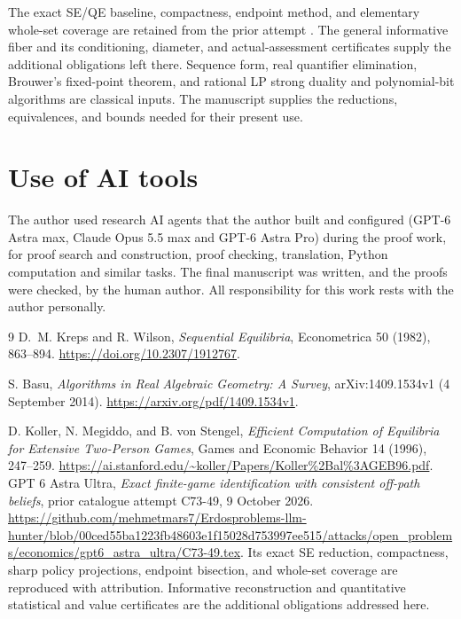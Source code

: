 \documentclass[11pt,a4paper]{article}
\numberwithin{equation}{section}
\theoremstyle{definition}
\begin{document}
The exact SE/QE baseline, compactness, endpoint method, and elementary
whole-set coverage are retained from the prior attempt \cite{Prior}.
The general informative fiber and its conditioning, diameter, and
actual-assessment certificates supply the additional obligations
left there. Sequence form, real quantifier elimination, Brouwer's
fixed-point theorem, and rational LP strong duality and polynomial-bit
algorithms are classical inputs. The manuscript supplies the
reductions, equivalences, and bounds needed for their present use.

\section*{Use of AI tools}
The author used research AI agents that the author built and configured (GPT-6 Astra max,
Claude Opus 5.5 max and GPT-6 Astra Pro) during the proof work, for proof search and
construction, proof checking, translation, Python computation and similar tasks. The final
manuscript was written, and the proofs were checked, by the human author. All responsibility
for this work rests with the author personally.

\begin{thebibliography}{9}
D.~M. Kreps and R. Wilson,
\emph{Sequential Equilibria},
Econometrica 50 (1982), 863--894.
\url{https://doi.org/10.2307/1912767}.

S. Basu, \emph{Algorithms in Real Algebraic Geometry: A Survey},
arXiv:1409.1534v1 (4 September 2014).
\url{https://arxiv.org/pdf/1409.1534v1}.

D. Koller, N. Megiddo, and B. von Stengel,
\emph{Efficient Computation of Equilibria for Extensive Two-Person Games},
Games and Economic Behavior 14 (1996), 247--259.
\url{https://ai.stanford.edu/~koller/Papers/Koller%2Bal%3AGEB96.pdf}.
GPT 6 Astra Ultra,
\emph{Exact finite-game identification with consistent off-path beliefs},
prior catalogue attempt C73-49, 9 October 2026.
\url{https://github.com/mehmetmars7/Erdosproblems-llm-hunter/blob/00ced55ba1223fb48603e1f15028d753997ee515/attacks/open_problems/economics/gpt6_astra_ultra/C73-49.tex}.
Its exact SE reduction, compactness, sharp policy projections,
endpoint bisection, and whole-set coverage are reproduced with
attribution. Informative reconstruction and quantitative statistical
and value certificates are the additional obligations addressed here.

\end{thebibliography}
\end{document}

